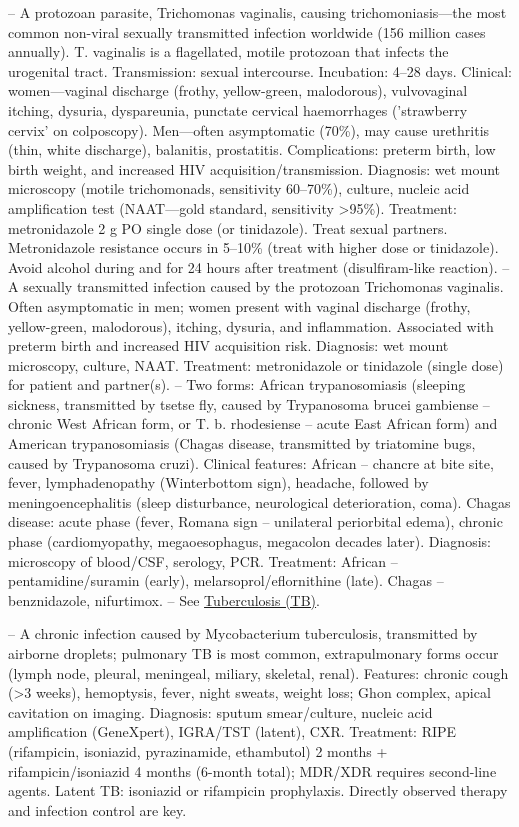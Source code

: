 -- A protozoan parasite, Trichomonas vaginalis, causing trichomoniasis—the most common non-viral sexually transmitted infection worldwide (156 million cases annually). T. vaginalis is a flagellated, motile protozoan that infects the urogenital tract. Transmission: sexual intercourse. Incubation: 4--28 days. Clinical: women—vaginal discharge (frothy, yellow-green, malodorous), vulvovaginal itching, dysuria, dyspareunia, punctate cervical haemorrhages ('strawberry cervix' on colposcopy). Men—often asymptomatic (70\%), may cause urethritis (thin, white discharge), balanitis, prostatitis. Complications: preterm birth, low birth weight, and increased HIV acquisition/transmission. Diagnosis: wet mount microscopy (motile trichomonads, sensitivity 60--70\%), culture, nucleic acid amplification test (NAAT—gold standard, sensitivity >95\%). Treatment: metronidazole 2 g PO single dose (or tinidazole). Treat sexual partners. Metronidazole resistance occurs in 5--10\% (treat with higher dose or tinidazole). Avoid alcohol during and for 24 hours after treatment (disulfiram-like reaction).
-- A sexually transmitted infection caused by the protozoan Trichomonas vaginalis. Often asymptomatic in men; women present with vaginal discharge (frothy, yellow-green, malodorous), itching, dysuria, and inflammation. Associated with preterm birth and increased HIV acquisition risk. Diagnosis: wet mount microscopy, culture, NAAT. Treatment: metronidazole or tinidazole (single dose) for patient and partner(s).
-- Two forms: African trypanosomiasis (sleeping sickness, transmitted by tsetse fly, caused by Trypanosoma brucei gambiense -- chronic West African form, or T. b. rhodesiense -- acute East African form) and American trypanosomiasis (Chagas disease, transmitted by triatomine bugs, caused by Trypanosoma cruzi). Clinical features: African -- chancre at bite site, fever, lymphadenopathy (Winterbottom sign), headache, followed by meningoencephalitis (sleep disturbance, neurological deterioration, coma). Chagas disease: acute phase (fever, Romana sign -- unilateral periorbital edema), chronic phase (cardiomyopathy, megaoesophagus, megacolon decades later). Diagnosis: microscopy of blood/CSF, serology, PCR. Treatment: African -- pentamidine/suramin (early), melarsoprol/eflornithine (late). Chagas -- benznidazole, nifurtimox.
-- See \hyperlink{Tuberculosis (TB)}{Tuberculosis (TB)}.

-- A chronic infection caused by Mycobacterium tuberculosis, transmitted by airborne droplets; pulmonary TB is most common, extrapulmonary forms occur (lymph node, pleural, meningeal, miliary, skeletal, renal). Features: chronic cough (>3 weeks), hemoptysis, fever, night sweats, weight loss; Ghon complex, apical cavitation on imaging. Diagnosis: sputum smear/culture, nucleic acid amplification (GeneXpert), IGRA/TST (latent), CXR. Treatment: RIPE (rifampicin, isoniazid, pyrazinamide, ethambutol) 2 months + rifampicin/isoniazid 4 months (6-month total); MDR/XDR requires second-line agents. Latent TB: isoniazid or rifampicin prophylaxis. Directly observed therapy and infection control are key.

